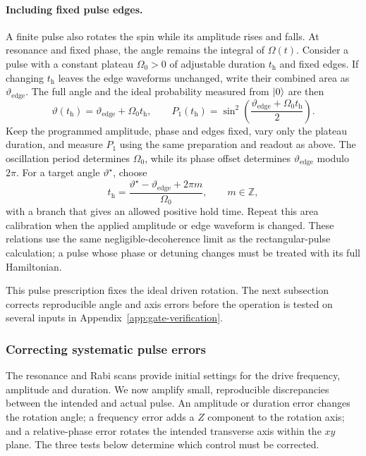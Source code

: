 \paragraph{Including fixed pulse edges.}
A finite pulse also rotates the spin while its amplitude rises and
falls. At resonance and fixed phase, the angle remains the integral
of $\Omega(t)$. Consider a pulse with a constant plateau $\Omega_0>0$
of adjustable duration $t_{\mathrm h}$ and fixed edges. If changing
$t_{\mathrm h}$ leaves the edge waveforms unchanged, write their
combined area as $\vartheta_{\mathrm{edge}}$. The full angle and the
ideal probability measured from $\lvert 0\rangle$ are then
\begin{equation}
 \vartheta(t_{\mathrm h})
    =\vartheta_{\mathrm{edge}}+\Omega_0t_{\mathrm h},\qquad
 P_1(t_{\mathrm h})
    =\sin^2\!\left(\frac{\vartheta_{\mathrm{edge}}
                              +\Omega_0t_{\mathrm h}}{2}\right).
 \label{eq:calibration-drive-edge-area}
\end{equation}
Keep the programmed amplitude, phase and edges fixed, vary only
the plateau duration, and measure $P_1$ using the same preparation
and readout as above. The oscillation period determines $\Omega_0$,
while its phase offset determines $\vartheta_{\mathrm{edge}}$ modulo
$2\pi$. For a target angle $\vartheta^\star$, choose
\begin{equation}
 t_{\mathrm h}
   =\frac{\vartheta^\star-\vartheta_{\mathrm{edge}}+2\pi m}{\Omega_0},
 \qquad m\in\mathbb Z,
 \label{eq:calibration-drive-hold-duration}
\end{equation}
with a branch that gives an allowed positive hold time. Repeat this
area calibration when the applied amplitude or edge waveform is
changed. These relations use the same negligible-decoherence limit
as the rectangular-pulse calculation; a pulse whose phase or
detuning changes must be treated with its full Hamiltonian.

This pulse prescription fixes the ideal driven rotation. The next
subsection corrects reproducible angle and axis errors before the
operation is tested on several inputs in
Appendix~\ref{app:gate-verification}.

\subsubsection{Correcting systematic pulse errors}
\label{sec:calibration-spin-corrections}

The resonance and Rabi scans provide initial settings for the drive
frequency, amplitude and duration. We now amplify small,
reproducible discrepancies between the intended and actual pulse.
An amplitude or duration error changes the rotation angle; a
frequency error adds a $Z$ component to the rotation axis; and a
relative-phase error rotates the intended transverse axis within
the $xy$ plane. The three tests below determine which control must
be corrected.

